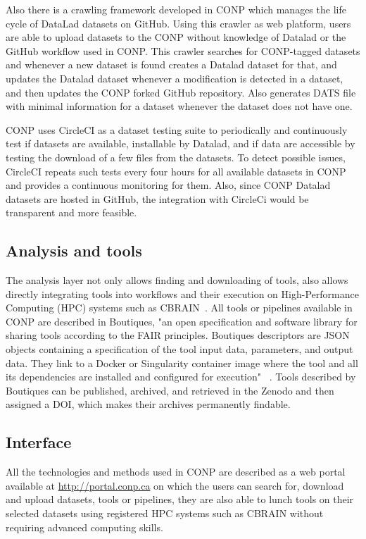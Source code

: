 Also there is a crawling framework developed in CONP which manages the life cycle of DataLad datasets on GitHub. Using this crawler as web platform, users are able to upload datasets to the CONP without knowledge of Datalad or the GitHub workflow used in CONP. This crawler searches for CONP-tagged datasets and whenever a new dataset is found creates a Datalad dataset for that, and updates the Datalad dataset whenever a modification is detected in a dataset, and then updates the CONP forked GitHub repository. Also generates DATS file with minimal information for a dataset whenever the dataset does not have one.

CONP uses CircleCI as a dataset testing suite to periodically and continuously test if datasets are available, installable by Datalad, and if data are accessible by testing the download of a few files from the datasets. To detect possible issues, CircleCI repeats such tests every four hours for all available datasets in CONP and provides a continuous monitoring for them. Also, since CONP Datalad datasets are hosted in GitHub, the integration with CircleCi would be transparent and more feasible.

\subsection{Analysis and tools}
The analysis layer not only allows finding and downloading of tools, also allows directly integrating tools into workflows and their execution on High-Performance Computing (HPC) systems such as CBRAIN~\cite{}. All tools or pipelines available in CONP are described in Boutiques, "an open specification and software library for sharing tools according to the FAIR principles. Boutiques descriptors are JSON objects containing a specification of the tool input data, parameters, and output data. They link to a Docker or Singularity container image where the tool and all its dependencies are installed and configured for execution"~\cite{conppaper}  . Tools described by Boutiques  can be published, archived, and retrieved in the Zenodo and then assigned a DOI, which makes their archives permanently findable.

\subsection{Interface}
All the technologies and methods used in CONP are described as a web portal available at \url{http://portal.conp.ca} on which the users can search for, download and upload datasets, tools or pipelines, they are also able to lunch tools on their selected datasets using registered HPC systems such as CBRAIN without requiring advanced computing skills.  


